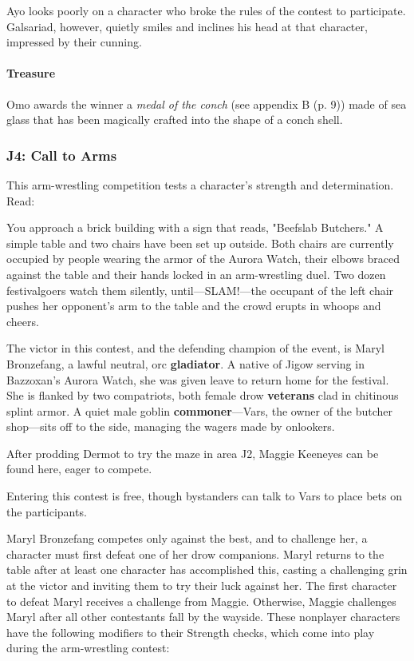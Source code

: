 \documentclass[letterpaper, 11pt, bg=full, twocolumn]{dndbook}
\begin{document}
Ayo looks poorly on a character who broke the rules of the contest to participate. Galsariad, however, quietly smiles and inclines his head at that character, impressed by their cunning.

\paragraph{Treasure}

Omo awards the winner a \textit{medal of the conch} (see appendix B (p. 9)) made of sea glass that has been magically crafted into the shape of a conch shell.

\subsubsection{J4: Call to Arms}

This arm-wrestling competition tests a character's strength and determination. Read:

\begin{DndReadAloud}
You approach a brick building with a sign that reads, "Beefslab Butchers." A simple table and two chairs have been set up outside. Both chairs are currently occupied by people wearing the armor of the Aurora Watch, their elbows braced against the table and their hands locked in an arm-wrestling duel. Two dozen festivalgoers watch them silently, until---SLAM!---the occupant of the left chair pushes her opponent's arm to the table and the crowd erupts in whoops and cheers.
\end{DndReadAloud}

The victor in this contest, and the defending champion of the event, is Maryl Bronzefang, a lawful neutral, orc \textbf{gladiator}. A native of Jigow serving in Bazzoxan's Aurora Watch, she was given leave to return home for the festival. She is flanked by two compatriots, both female drow \textbf{veterans} clad in chitinous splint armor. A quiet male goblin \textbf{commoner}---Vars, the owner of the butcher shop---sits off to the side, managing the wagers made by onlookers.

After prodding Dermot to try the maze in area J2, Maggie Keeneyes can be found here, eager to compete.

Entering this contest is free, though bystanders can talk to Vars to place bets on the participants.

Maryl Bronzefang competes only against the best, and to challenge her, a character must first defeat one of her drow companions. Maryl returns to the table after at least one character has accomplished this, casting a challenging grin at the victor and inviting them to try their luck against her. The first character to defeat Maryl receives a challenge from Maggie. Otherwise, Maggie challenges Maryl after all other contestants fall by the wayside. These nonplayer characters have the following modifiers to their Strength checks, which come into play during the arm-wrestling contest:
\end{document}
